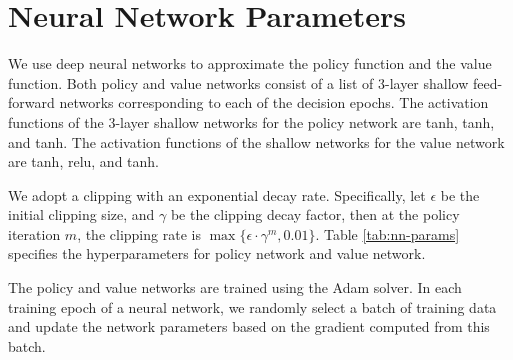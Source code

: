 \section{Neural Network Parameters} \label{sec:appendix-dnn}
We use deep neural networks to approximate the policy function and the value function. Both policy and value networks consist of a list of 3-layer shallow feed-forward networks corresponding to each of the decision epochs. The activation functions of the 3-layer shallow networks for the policy network are tanh, tanh, and tanh. The activation functions of the shallow networks for the value network are tanh, relu, and tanh. 

We adopt a clipping with an exponential decay rate. Specifically, let $\epsilon$ be the initial clipping size, and $\gamma$ be the clipping decay factor, then at the policy iteration $m$, the clipping rate is $\max\{\epsilon \cdot \gamma^m, 0.01\}$. Table \ref{tab:nn-params} specifies the hyperparameters for policy network and value network. 

The policy and value networks are trained using the Adam solver. In each training epoch of a neural network, we randomly select a batch of training data and update the network parameters based on the gradient computed from this batch. %

